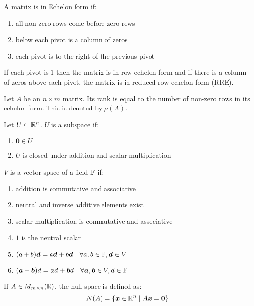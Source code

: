 \documentclass[a4paper,10pt]{article}
\begin{document}
\begin{defn}
	A matrix is in Echelon form if:
	\begin{enumerate}
		\item all non-zero rows come before zero rows
		\item below each pivot is a column of zeros
		\item each pivot is to the right of the previous pivot
	\end{enumerate}

	If each pivot is $1$ then the matrix is in row echelon form and if
	there is a column of zeros above each pivot, the matrix is in reduced
	row echelon form (RRE).
\end{defn}

\begin{defn}[Rank]
	Let $A$ be an $n \times m$ matrix. Its rank is equal to the number of
	non-zero rows in its echelon form. This is denoted by $\rho(A)$.
\end{defn}

\begin{defn}[Subspace]
	Let $U \subset \mathbb{R}^n$. $U$ is a subspace if:
	\begin{enumerate}
		\item $\bm{0} \in U$
		\item $U$ is closed under addition and scalar multiplication
	\end{enumerate}
\end{defn}

\begin{defn}
	$V$ is a vector space of a field $\mathbb{F}$ if:
	\begin{enumerate}
		\item addition is commutative and associative
		\item neutral and inverse additive elements exist
		\item scalar multiplication is commutative and associative
		\item $1$ is the neutral scalar
		\item $(a+b)\bm{d} = a\bm{d} + b\bm{d} \quad \forall a,b \in \mathbb{F}, \bm{d} \in V$
		\item $(\bm{a} + \bm{b})d = \bm{a}d + \bm{b}d \quad \forall \bm{a},\bm{b} \in V, d \in \mathbb{F}$
	\end{enumerate}
\end{defn}

\begin{defn}
	If $A \in M_{m \times n}(\mathbb{R})$, the null space is defined as:
	\[
		N(A) = \{ \bm{x} \in \mathbb{R}^n \mid A\bm{x} = \bm{0} \}
	\]
\end{defn}
\end{document}
